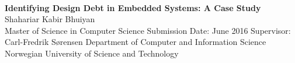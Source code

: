 
\thispagestyle{empty}
\mbox{}\\[6pc]

\begin{center}
\Huge{\textbf{Identifying Design Debt in Embedded Systems: A Case Study}}\\[4pc]
\Large{Shahariar Kabir Bhuiyan}\\[1pc]


\noindent Master of Science in Computer Science
\linebreak
\noindent Submission Date: June 2016
\linebreak
\noindent Supervisor: Carl-Fredrik Sørensen
\linebreak
\linebreak
\noindent Department of Computer and Information Science\\
\noindent Norwegian University of Science and Technology
\end{center}

\vfill


